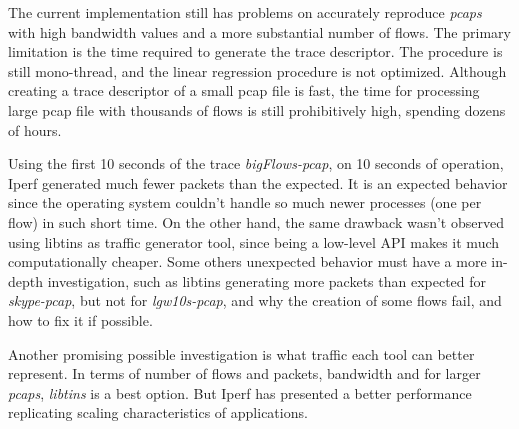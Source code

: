 The current implementation still has problems on accurately reproduce \textit{pcaps} with high bandwidth values and a more substantial number of flows. The primary limitation is the time required to generate the trace descriptor.  The procedure is still mono-thread, and the linear regression procedure is not optimized. Although creating a trace descriptor of a small pcap file is fast, the time for processing large pcap file with thousands of flows is still prohibitively high, spending dozens of hours. 

Using the first 10 seconds of the trace \textit{bigFlows-pcap}, on 10 seconds of operation, Iperf generated much fewer packets than the expected. It is an expected behavior since the operating system couldn't handle so much newer processes (one per flow) in such short time. On the other hand, the same drawback wasn't observed using libtins as traffic generator tool, since being a low-level API makes it much computationally cheaper.  Some others unexpected behavior must have a more in-depth investigation, such as libtins generating more packets than expected for \textit{skype-pcap}, but not for \textit{lgw10s-pcap}, and why the creation of some flows fail, and how to fix it if possible. 

Another promising possible investigation is what traffic each tool can better represent. In terms of number of flows and packets, bandwidth and for larger \textit{pcaps}, \textit{libtins} is a best option. But Iperf has presented a better performance replicating scaling characteristics of applications. 